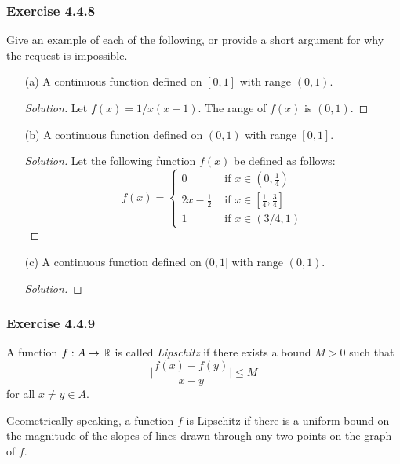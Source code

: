 \subsubsection{Exercise 4.4.8} Give an example of each of the following, or provide a short argument for why the request is impossible.
\begin{enumerate}
    \item[(a)] A continuous function defined on \( [0,1] \) with range \( (0,1) \).
        \begin{proof}[Solution]
        Let \( f(x) = 1 / x(x+1) \). The range of \( f(x) \) is \( (0,1) \).   
        \end{proof}
    \item[(b)] A continuous function defined on \( (0,1) \) with range \( [0,1] \).
        \begin{proof}[Solution]
        Let the following function \( f(x) \) be defined as follows:
        \[ f(x) = 
        \begin{cases}
            0 &\text{ if } x \in (0, \frac{ 1 }{ 4 } ) \\
            2x - \frac{ 1 }{ 2 } &\text{ if } x \in [ \frac{ 1 }{ 4 }, \frac{ 3 }{ 4 } ] \\
            1 &\text{ if } x \in (3/4, 1)
        \end{cases} \]
        \end{proof}
    \item[(c)] A continuous function defined on \( (0,1] \) with range \( (0,1) \).
        \begin{proof}[Solution]
        
        \end{proof}
\end{enumerate}


\subsubsection{Exercise 4.4.9}
    \begin{definition}
        A function \( f: A \to \mathbb{R}  \) is called \textit{Lipschitz} if there exists a bound \( M > 0  \) such that 
        \[ \Big| \frac{ f(x) - f(y) }{ x - y  }   \Big| \leq M  \]
        for all \( x \neq y \in A  \).
    \end{definition}
Geometrically speaking, a function \( f \) is Lipschitz if there is a uniform bound on the magnitude of the slopes of lines drawn through any two points on the graph of \( f \).

